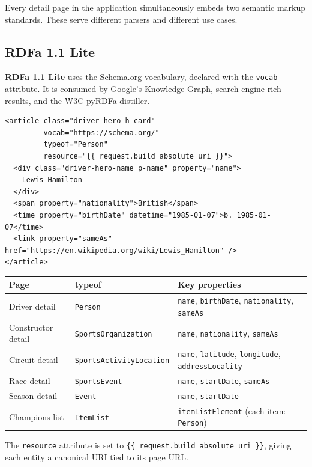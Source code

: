 \documentclass[12pt,a4paper]{article}
\begin{document}
Every detail page in the application simultaneously embeds two semantic markup
standards. These serve different parsers and different use cases.

\subsection{RDFa 1.1 Lite}

\textbf{RDFa 1.1 Lite} uses the Schema.org vocabulary, declared with the
\texttt{vocab} attribute. It is consumed by Google's Knowledge Graph, search
engine rich results, and the W3C pyRDFa distiller.

\begin{lstlisting}[style=html, caption={RDFa on the driver detail page}]
<article class="driver-hero h-card"
         vocab="https://schema.org/"
         typeof="Person"
         resource="{{ request.build_absolute_uri }}">
  <div class="driver-hero-name p-name" property="name">
    Lewis Hamilton
  </div>
  <span property="nationality">British</span>
  <time property="birthDate" datetime="1985-01-07">b. 1985-01-07</time>
  <link property="sameAs" href="https://en.wikipedia.org/wiki/Lewis_Hamilton" />
</article>
\end{lstlisting}

\begin{center}
\begin{tabular}{@{}lll@{}}
\toprule
\textbf{Page} & \textbf{typeof} & \textbf{Key properties} \\
\midrule
Driver detail & \texttt{Person} & \texttt{name}, \texttt{birthDate}, \texttt{nationality}, \texttt{sameAs} \\
Constructor detail & \texttt{SportsOrganization} & \texttt{name}, \texttt{nationality}, \texttt{sameAs} \\
Circuit detail & \texttt{SportsActivityLocation} & \texttt{name}, \texttt{latitude}, \texttt{longitude}, \texttt{addressLocality} \\
Race detail & \texttt{SportsEvent} & \texttt{name}, \texttt{startDate}, \texttt{sameAs} \\
Season detail & \texttt{Event} & \texttt{name}, \texttt{startDate} \\
Champions list & \texttt{ItemList} & \texttt{itemListElement} (each item: \texttt{Person}) \\
\bottomrule
\end{tabular}
\end{center}

The \texttt{resource} attribute is set to \texttt{\{\{\ request.build\_absolute\_uri\ \}\}},
giving each entity a canonical URI tied to its page URL.
\end{document}

